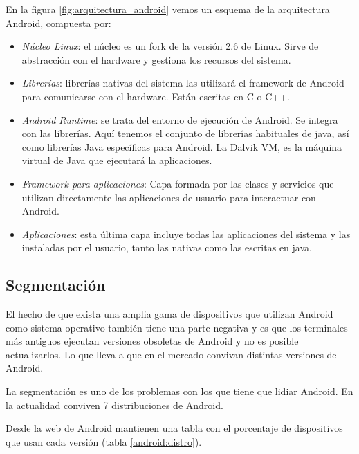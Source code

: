 En la figura \ref{fig:arquitectura_android} vemos un esquema de la arquitectura Android, compuesta por:
\begin{itemize}
\item \emph{Núcleo Linux}: el núcleo es un fork de la versión 2.6 de Linux. Sirve de abstracción con el hardware y gestiona los recursos del sistema. 
\item \emph{Librerías}: librerías nativas del sistema las utilizará el framework de Android para comunicarse con el hardware. Están escritas en C o C++.
\item \emph{Android Runtime}: se trata del entorno de ejecución de Android. Se integra con las librerías. Aquí tenemos el conjunto de librerías habituales de java, así como librerías Java específicas para Android. La Dalvik VM, es la máquina virtual de Java que ejecutará la aplicaciones. 
\item \emph{Framework para aplicaciones}: Capa formada por las clases y servicios que utilizan directamente las aplicaciones de usuario para interactuar con Android. 
\item \emph{Aplicaciones}: esta última capa incluye todas las aplicaciones del sistema y las instaladas por el usuario, tanto las nativas como las escritas en java.

\end{itemize}




\subsection{Segmentación}
El hecho de que exista una amplia gama de dispositivos que utilizan Android como sistema operativo también tiene una parte negativa y es que los terminales más antiguos ejecutan versiones obsoletas de Android y no es posible actualizarlos. Lo que lleva a que en el mercado convivan distintas versiones de Android.\par

La segmentación es uno de los problemas con los que tiene que lidiar Android. En la actualidad conviven 7 distribuciones de Android.\par
Desde la web de Android \cite{android} mantienen una tabla con el porcentaje de dispositivos que usan cada versión (tabla \ref{android:distro}).\medskip\par


